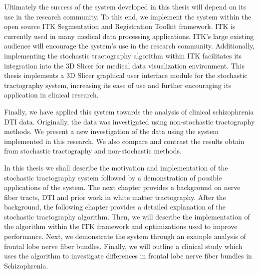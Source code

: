 Ultimately the success of the system developed in this thesis will depend on its use in the research community.  To this end, we implement the system within the open source ITK Segmentation and Registration Toolkit \cite{itk} framework.  ITK is currently used in many medical data processing applications.  ITK's large existing audience will encourage the system's use in the research community.  Additionally, implementing the stochastic tractography algorithm within ITK facilitates its integration into the 3D Slicer \cite{3Dslicer} for medical data visualization environment.  This thesis implements a 3D Slicer graphical user interface module for the stochastic tractography system, increasing its ease of use and further encouraging its application in clinical research.

Finally, we have applied this system towards the analysis of clinical schizophrenia DTI data.  Originally, the data was investigated using non-stochastic tractography methods.  We present a new investigation of the data using the system implemented in this research.  We also compare and contrast the results obtain from stochastic tractography and non-stochastic methods.

In this thesis we shall describe the motivation and implementation of the stochastic tractography system followed by a demonstration of possible applications of the system.  The next chapter  provides a background on nerve fiber tracts, DTI and prior work in white matter tractography.  After the background, the following chapter provides a detailed explanation of the stochastic tractography algorithm.  Then, we will describe the implementation of the algorithm within the ITK framework and optimizations used to improve performance.  Next, we demonstrate the system through an example analysis of frontal lobe nerve fiber bundles.  Finally, we will outline a clinical study which uses the algorithm to investigate differences in frontal lobe nerve fiber bundles in Schizophrenia.


